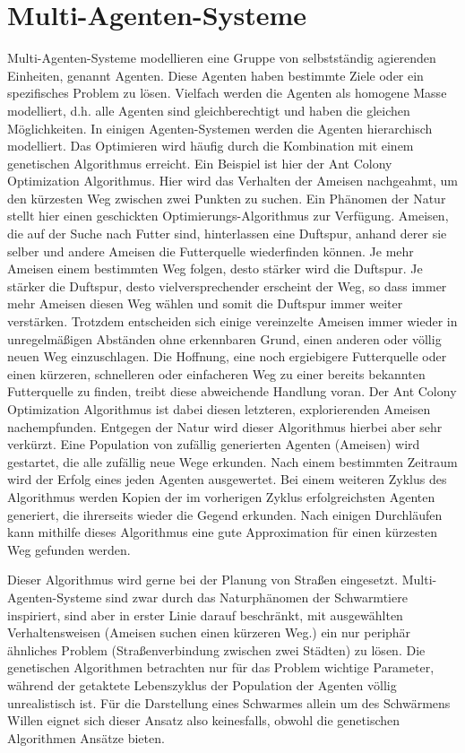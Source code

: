 \documentclass[draft=false
              ,paper=a4
              ,twoside=false
              ,fontsize=11pt
              ,headsepline
              ,BCOR10mm
              ,DIV11
              ,bibtotoc
              ,liststotoc
              ]{scrbook}
\begin{document}
\section{Multi-Agenten-Systeme}
Multi-Agenten-Systeme modellieren eine Gruppe von selbstständig agierenden Einheiten, genannt Agenten. Diese Agenten haben bestimmte Ziele oder ein spezifisches Problem zu lösen. Vielfach werden die Agenten als homogene Masse modelliert, d.h. alle Agenten sind gleichberechtigt und haben die gleichen Möglichkeiten. In einigen Agenten-Systemen werden die Agenten hierarchisch modelliert. Das Optimieren wird häufig durch die Kombination mit einem genetischen Algorithmus erreicht.
Ein Beispiel ist hier der Ant Colony Optimization Algorithmus. Hier wird das Verhalten der Ameisen nachgeahmt, um den kürzesten Weg zwischen zwei Punkten zu suchen. Ein Phänomen der Natur stellt hier einen geschickten Optimierungs-Algorithmus zur Verfügung. Ameisen, die auf der Suche nach Futter sind, hinterlassen eine Duftspur, anhand derer sie selber und andere Ameisen die Futterquelle wiederfinden können. Je mehr Ameisen einem bestimmten Weg folgen, desto stärker wird die Duftspur. Je stärker die Duftspur, desto vielversprechender erscheint der Weg, so dass immer mehr Ameisen diesen Weg wählen und somit die Duftspur immer weiter verstärken. Trotzdem entscheiden sich einige vereinzelte Ameisen immer wieder in unregelmäßigen Abständen ohne erkennbaren Grund, einen anderen oder völlig neuen Weg einzuschlagen. Die Hoffnung, eine noch ergiebigere Futterquelle oder einen kürzeren, schnelleren oder einfacheren Weg zu einer bereits bekannten Futterquelle zu finden, treibt diese abweichende Handlung voran. Der Ant Colony Optimization Algorithmus ist dabei diesen letzteren, explorierenden Ameisen nachempfunden. Entgegen der Natur wird dieser Algorithmus hierbei aber sehr verkürzt. Eine Population von zufällig generierten Agenten (Ameisen) wird gestartet, die alle zufällig neue Wege erkunden. Nach einem bestimmten Zeitraum wird der Erfolg eines jeden Agenten ausgewertet. Bei einem weiteren Zyklus des Algorithmus werden Kopien der im vorherigen Zyklus erfolgreichsten Agenten generiert, die ihrerseits wieder die Gegend erkunden. Nach einigen Durchläufen kann mithilfe dieses Algorithmus eine gute Approximation für einen kürzesten Weg gefunden werden.

Dieser Algorithmus wird gerne bei der Planung von Straßen eingesetzt. Multi-Agenten-Systeme sind zwar durch das Naturphänomen der Schwarmtiere inspiriert, sind aber in erster Linie darauf beschränkt, mit ausgewählten Verhaltensweisen (Ameisen suchen einen kürzeren Weg.) ein nur periphär ähnliches Problem (Straßenverbindung zwischen zwei Städten) zu lösen. Die genetischen Algorithmen betrachten nur für das Problem wichtige Parameter, während der getaktete Lebenszyklus der Population der Agenten völlig unrealistisch ist. Für die Darstellung eines Schwarmes allein um des Schwärmens Willen eignet sich dieser Ansatz also keinesfalls, obwohl die genetischen Algorithmen Ansätze bieten.
\end{document}
